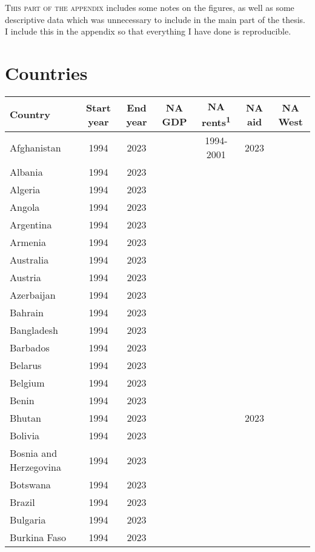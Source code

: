 \lettrine{T}{his part of the appendix} includes some notes on the figures, as well as some descriptive data which was unnecessary to include in the main part of the thesis. I include this in the appendix so that everything I have done is reproducible.

\section{Countries} \label{sec:countries}



{\fontsize{8pt}{8pt}\selectfont\tabcolsep=2pt\centering  %
\begin{longtable}{lcccccc}
\toprule
Country & Start year & End year & NA GDP & NA rents\textsuperscript{1} & NA aid & NA West\\
\midrule
Afghanistan & 1994 & 2023 &  & 1994-2001 & 2023 & \\
Albania & 1994 & 2023 &  &  &  & \\
Algeria & 1994 & 2023 &  &  &  & \\
Angola & 1994 & 2023 &  &  &  & \\
Argentina & 1994 & 2023 &  &  &  & \\
\addlinespace
Armenia & 1994 & 2023 &  &  &  & \\
Australia & 1994 & 2023 &  &  &  & \\
Austria & 1994 & 2023 &  &  &  & \\
Azerbaijan & 1994 & 2023 &  &  &  & \\
Bahrain & 1994 & 2023 &  &  &  & \\
\addlinespace
Bangladesh & 1994 & 2023 &  &  &  & \\
Barbados & 1994 & 2023 &  &  &  & \\
Belarus & 1994 & 2023 &  &  &  & \\
Belgium & 1994 & 2023 &  &  &  & \\
Benin & 1994 & 2023 &  &  &  & \\
\addlinespace
Bhutan & 1994 & 2023 &  &  & 2023 & \\
Bolivia & 1994 & 2023 &  &  &  & \\
Bosnia and Herzegovina & 1994 & 2023 &  &  &  & \\
Botswana & 1994 & 2023 &  &  &  & \\
Brazil & 1994 & 2023 &  &  &  & \\
\addlinespace
Bulgaria & 1994 & 2023 &  &  &  & \\
Burkina Faso & 1994 & 2023 &  &  &  & \\

\end{longtable}}
